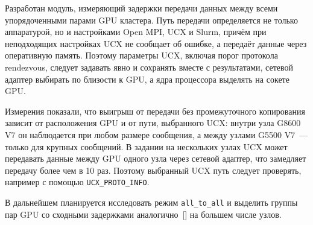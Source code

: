 Разработан модуль, измеряющий задержки передачи данных между всеми упорядоченными парами GPU кластера. Путь передачи определяется не только аппаратурой, но и настройками Open MPI, UCX и Slurm, причём при неподходящих настройках UCX не сообщает об ошибке, а передаёт данные через оперативную память. Поэтому параметры UCX, включая порог протокола rendezvous, следует задавать явно и сохранять вместе с результатами, сетевой адаптер выбирать по близости к GPU, а ядра процессора выделять на сокете GPU.

Измерения показали, что выигрыш от передачи без промежуточного копирования зависит от расположения GPU и от пути, выбранного UCX: внутри узла G8600 V7 он наблюдается при любом размере сообщения, а между узлами G5500 V7~--- только для крупных сообщений. В задании на нескольких узлах UCX может передавать данные между GPU одного узла через сетевой адаптер, что замедляет передачу более чем в 10 раз. Поэтому выбранный UCX путь следует проверять, например с помощью \texttt{UCX\_PROTO\_INFO}.

В дальнейшем планируется исследовать режим \texttt{all\_to\_all} и выделить группы пар GPU со сходными задержками аналогично~[] на большем числе узлов.

